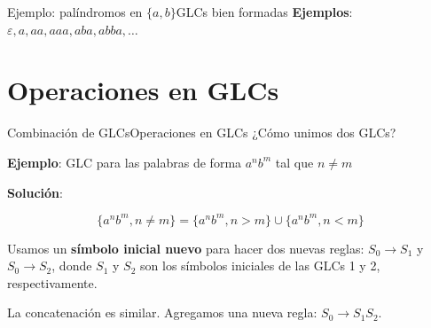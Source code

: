 \documentclass[spanish, handout]{beamer}
\begin{document}
\begin{frame}{Ejemplo: palíndromos en $\{a,b\}$}{GLCs bien formadas}
    \textbf{Ejemplos}: $\varepsilon, a, aa, aaa, aba, abba, \dots$ \pause

    \bigskip






\end{frame}

\section{Operaciones en GLCs}

\begin{frame}{Combinación de GLCs}{Operaciones en GLCs}
    ¿Cómo \alert{unimos} dos GLCs? \pause

    \bigskip

    \textbf{Ejemplo}: GLC para las palabras de forma $a^nb^m$ tal que $n \neq m$ \pause

    \bigskip

    \textbf{Solución}:

    $$\{a^n b^m, n \neq m\} = \{a^n b^m, n > m\} \cup \{a ^n b ^m, n < m\}$$ \pause

    Usamos un \textbf{símbolo inicial nuevo} para hacer dos nuevas reglas: $S_0 \to S_1$ y $S_0 \to S_2$, donde $S_1$ y $S_2$ son los símbolos iniciales de las GLCs 1 y 2, respectivamente. \pause

    \bigskip

    La \alert{concatenación} es similar. Agregamos una nueva regla: $S_0 \to S_1S_2$.
\end{frame}
\end{document}

